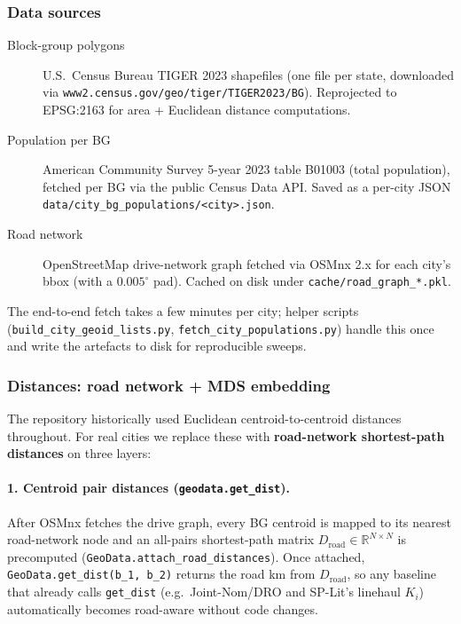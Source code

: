 \subsubsection{Data sources}

\begin{description}
  \item[Block-group polygons] U.S.\ Census Bureau TIGER 2023
    shapefiles (one file per state, downloaded via
    \texttt{www2.census.gov/geo/tiger/TIGER2023/BG}). Reprojected to
    EPSG:2163 for area + Euclidean distance computations.
  \item[Population per BG] American Community Survey 5-year 2023
    table B01003 (total population), fetched per BG via the public
    Census Data API. Saved as a per-city JSON
    \verb|data/city_bg_populations/<city>.json|.
  \item[Road network] OpenStreetMap drive-network graph fetched via
    OSMnx 2.x for each city's bbox (with a $0.005^\circ$ pad).
    Cached on disk under \verb|cache/road_graph_*.pkl|.
\end{description}

The end-to-end fetch takes a few minutes per city; helper scripts
(\verb|build_city_geoid_lists.py|, \verb|fetch_city_populations.py|)
handle this once and write the artefacts to disk for reproducible
sweeps.

\subsubsection{Distances: road network + MDS embedding}

The repository historically used Euclidean centroid-to-centroid
distances throughout. For real cities we replace these with
\textbf{road-network shortest-path distances} on three layers:

\paragraph{1. Centroid pair distances (\texttt{geodata.get\_dist}).}
After OSMnx fetches the drive graph, every BG centroid is mapped to
its nearest road-network node and an all-pairs shortest-path matrix
$D_{\mathrm{road}} \in \mathbb{R}^{N \times N}$ is precomputed
(\verb|GeoData.attach_road_distances|). Once attached,
\verb|GeoData.get_dist(b_1, b_2)| returns the road km from
$D_{\mathrm{road}}$, so any baseline that already calls
\verb|get_dist| (e.g.\ Joint-Nom/DRO and SP-Lit's linehaul
$K_i$) automatically becomes road-aware without code changes.

